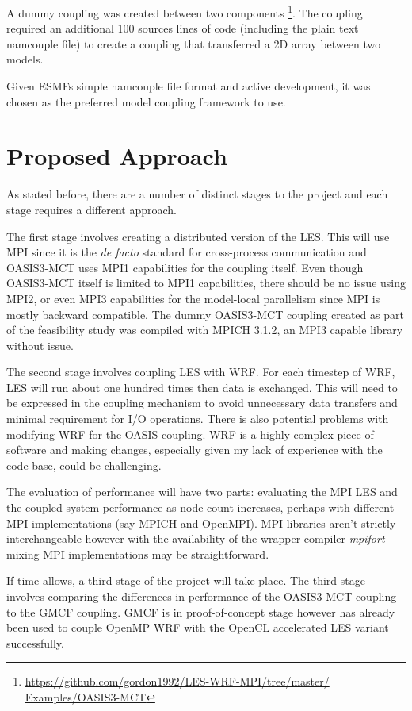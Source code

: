 \documentclass{acm_proc_article-sp}
\renewcommand{\_}{\underscore\hspace{0pt}}
\begin{document}

A dummy coupling was created between two components
\footnote{\url{https://github.com/gordon1992/LES-WRF-MPI/tree/master/
Examples/OASIS3-MCT}}.
The coupling required an additional 100 sources lines of code (including the
plain text namcouple file) to create a coupling that transferred a 2D array
between two models.

Given ESMFs simple namcouple file format and active development, it was chosen
as the preferred model coupling framework to use.

\section*{Proposed Approach}

As stated before, there are a number of distinct stages to the project and each
stage requires a different approach.

The first stage involves creating a distributed version of the LES. This will
use MPI since it is the \textit{de facto} standard for cross-process
communication and OASIS3-MCT uses MPI1 capabilities for the coupling itself.
Even though OASIS3-MCT itself is limited to MPI1 capabilities, there should be
no issue using MPI2, or even MPI3 capabilities for the model-local parallelism
since MPI is mostly backward compatible. The dummy OASIS3-MCT coupling created
as part of the feasibility study was compiled with MPICH 3.1.2, an MPI3 capable
library without issue.

The second stage involves coupling LES with WRF. For each timestep of WRF, LES
will run about one hundred times then data is exchanged. This will need to be
expressed in the coupling mechanism to avoid unnecessary data transfers and
minimal requirement for I/O operations. There is also potential problems with
modifying WRF for the OASIS coupling. WRF is a highly complex piece of software
and making changes, especially given my lack of experience with the code base,
could be challenging.

The evaluation of performance will have two parts: evaluating the MPI LES and
the coupled system performance as node count increases, perhaps with different
MPI implementations (say MPICH and OpenMPI). MPI libraries aren't strictly
interchangeable however with the availability of the wrapper compiler
\textit{mpifort} mixing MPI implementations may be straightforward.

If time allows, a third stage of the project will take place. The third stage
involves comparing the differences in performance of the OASIS3-MCT coupling to
the GMCF coupling. GMCF is in proof-of-concept stage however has already been
used to couple OpenMP WRF with the OpenCL accelerated LES variant successfully.
\end{document}
